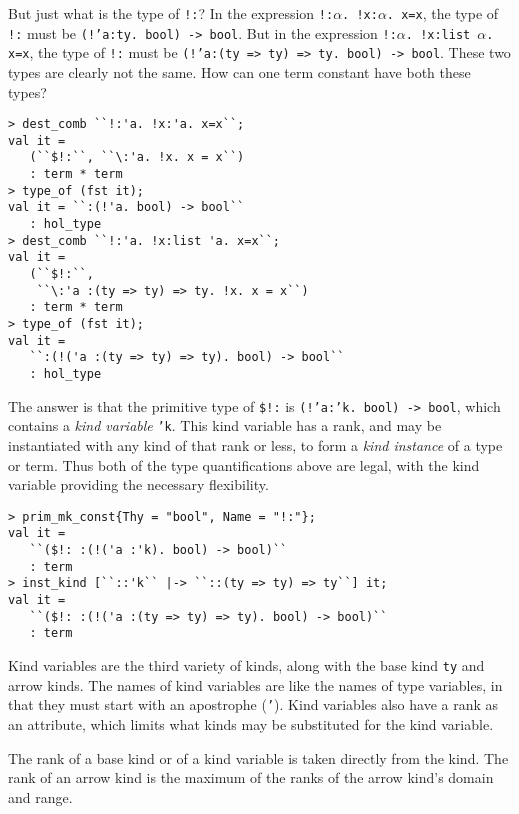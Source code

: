 But just what is the type of {\small\verb|!:|}?
In the expression
{\small\verb|!:|}$\alpha${\small\verb|. !x:|}$\alpha${\small\verb|. x=x|},
the type of {\small\verb|!:|} must be \texttt{(!'a:ty.~bool)~->~bool}.
But in the expression
{\small\verb|!:|}$\alpha${\small\verb|. !x:list|}~$\alpha${\small\verb|. x=x|},
the type of {\small\verb|!:|} must be
\texttt{(!'a:(ty~=>~ty)~=>~ty.~bool)~->~bool}.
These two types are clearly not the same.
How can one term constant have both these types?
%
\begin{session}
\begin{verbatim}
> dest_comb ``!:'a. !x:'a. x=x``;
val it =
   (``$!:``, ``\:'a. !x. x = x``)
   : term * term
> type_of (fst it);
val it = ``:(!'a. bool) -> bool``
   : hol_type
> dest_comb ``!:'a. !x:list 'a. x=x``;
val it =
   (``$!:``,
    ``\:'a :(ty => ty) => ty. !x. x = x``)
   : term * term
> type_of (fst it);
val it =
   ``:(!('a :(ty => ty) => ty). bool) -> bool``
   : hol_type
\end{verbatim}
\end{session}

\noindent
The answer is that the primitive type of {\small\verb|$!:|} is
\texttt{(!'a:'k.~bool)~->~bool}, which contains a {\it kind variable\/}
\texttt{'k}.  This kind variable has a rank, and may be instantiated with
any kind of that rank or less,
to form a {\it kind instance\/} of a type or term.  Thus both of the
type quantifications above are legal, with the kind variable providing
the necessary flexibility.
%
\begin{session}
\begin{verbatim}
> prim_mk_const{Thy = "bool", Name = "!:"};
val it =
   ``($!: :(!('a :'k). bool) -> bool)``
   : term
> inst_kind [``::'k`` |-> ``::(ty => ty) => ty``] it;
val it =
   ``($!: :(!('a :(ty => ty) => ty). bool) -> bool)``
   : term
\end{verbatim}
\end{session}

Kind variables are the third variety of kinds, along with the base kind
\texttt{ty} and arrow kinds.  The names of kind variables are like the 
names of type variables, in that they must start with an apostrophe
(\texttt{'}).  Kind variables also have a rank as an attribute, 
which limits what kinds may be substituted for the kind variable.

The rank of a base kind or of a kind variable is taken directly
from the kind.  The rank of an arrow kind is the maximum of the ranks of
the arrow kind's domain and range.

